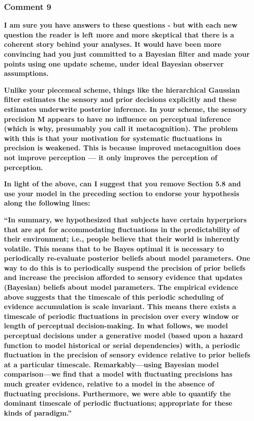 \documentclass[
]{article}
\begin{document}
\hypertarget{comment-9}{%
\subsubsection{Comment 9}\label{comment-9}}

\textbf{I am sure you have answers to these questions - but with each
new question the reader is left more and more skeptical that there is a
coherent story behind your analyses. It would have been more convincing
had you just committed to a Bayesian filter and made your points using
one update scheme, under ideal Bayesian observer assumptions.}

\textbf{Unlike your piecemeal scheme, things like the hierarchical
Gaussian filter estimates the sensory and prior decisions explicitly and
these estimates underwrite posterior inference. In your scheme, the
sensory precision M appears to have no influence on perceptual inference
(which is why, presumably you call it metacognition). The problem with
this is that your motivation for systematic fluctuations in precision is
weakened. This is because improved metacognition does not improve
perception --- it only improves the perception of perception.}

\textbf{In light of the above, can I suggest that you remove Section 5.8
and use your model in the preceding section to endorse your hypothesis
along the following lines:}

\textbf{``In summary, we hypothesized that subjects have certain
hyperpriors that are apt for accommodating fluctuations in the
predictability of their environment; i.e., people believe that their
world is inherently volatile. This means that to be Bayes optimal it is
necessary to periodically re-evaluate posterior beliefs about model
parameters. One way to do this is to periodically suspend the precision
of prior beliefs and increase the precision afforded to sensory evidence
that updates (Bayesian) beliefs about model parameters. The empirical
evidence above suggests that the timescale of this periodic scheduling
of evidence accumulation is scale invariant. This means there exists a
timescale of periodic fluctuations in precision over every window or
length of perceptual decision-making. In what follows, we model
perceptual decisions under a generative model (based upon a hazard
function to model historical or serial dependencies) with, a periodic
fluctuation in the precision of sensory evidence relative to prior
beliefs at a particular timescale. Remarkably---using Bayesian model
comparison---we find that a model with fluctuating precisions has much
greater evidence, relative to a model in the absence of fluctuating
precisions. Furthermore, we were able to quantify the dominant timescale
of periodic fluctuations; appropriate for these kinds of paradigm.''}
\end{document}
